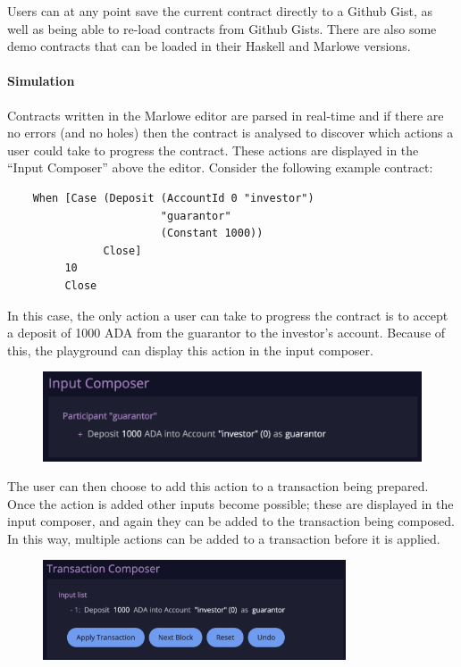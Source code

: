 \documentclass[runningheads]{llncs}
\begin{document}
Users can at any point save the current contract directly to a Github Gist, as well as being able to re-load contracts from Github Gists. There are also some demo contracts that can be loaded in their Haskell and Marlowe versions.

\paragraph{Simulation}

Contracts written in the Marlowe editor are parsed in real-time and if there are no errors (and no holes) then the contract is analysed to discover which actions a user could take to progress the contract. These actions are displayed in the ``Input Composer'' above the editor. Consider the following example contract:
\begin{verbatim}
    When [Case (Deposit (AccountId 0 "investor")
                        "guarantor"
                        (Constant 1000))
               Close]
         10
         Close
\end{verbatim}
In this case, the only action a user can take to progress the contract is to accept a deposit of 1000 ADA
from the guarantor to the investor's account. Because of this, the playground can display this action in the input composer.

\begin{figure}[]
    \includegraphics[width=1\textwidth]{input_composer.png}
\end{figure}

\noindent
The user can then choose to add this action to a transaction being prepared. Once the action is added other inputs become possible; these are displayed in the input composer, and again they can be added to the transaction being composed. In this way, multiple actions can be added to a transaction before it is applied.

\begin{figure}[]
    \includegraphics[width=0.8\textwidth]{tx_composer.png}
\end{figure}
\end{document}
